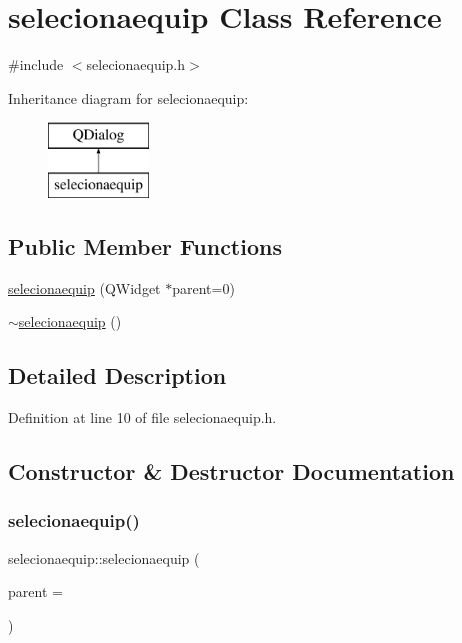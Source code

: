 \hypertarget{classselecionaequip}{}\section{selecionaequip Class Reference}
\label{classselecionaequip}


{\ttfamily \#include $<$selecionaequip.\+h$>$}

Inheritance diagram for selecionaequip\+:\begin{figure}[H]
\begin{center}
\leavevmode
\includegraphics[height=2.000000cm]{classselecionaequip}
\end{center}
\end{figure}
\subsection*{Public Member Functions}
\begin{DoxyCompactItemize}
\item 
\hyperlink{classselecionaequip_a3ccee0d0b533a3c3d7bb53f951f022ba}{selecionaequip} (Q\+Widget $\ast$parent=0)
\item 
\hyperlink{classselecionaequip_adabd9829153adf6adb64c75a79ac7964}{$\sim$selecionaequip} ()
\end{DoxyCompactItemize}


\subsection{Detailed Description}


Definition at line 10 of file selecionaequip.\+h.



\subsection{Constructor \& Destructor Documentation}
\hypertarget{classselecionaequip_a3ccee0d0b533a3c3d7bb53f951f022ba}{}\label{classselecionaequip_a3ccee0d0b533a3c3d7bb53f951f022ba} 
\subsubsection{\texorpdfstring{selecionaequip()}{selecionaequip()}}
{\footnotesize\ttfamily selecionaequip\+::selecionaequip (\begin{DoxyParamCaption}\item[{Q\+Widget $\ast$}]{parent = {} }\end{DoxyParamCaption})\hspace{0.3cm}{\ttfamily [explicit]}}

